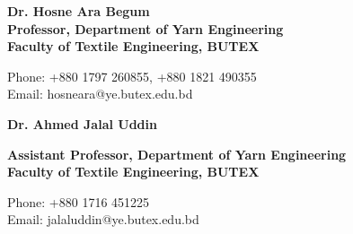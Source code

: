 \noindent
\begin{minipage}[t]{0.50\textwidth}
    \raggedright
    {\noindent\fontsize{12pt}{15pt}\bfseries Dr. Hosne Ara Begum } \\
    {\fontsize{10pt}{12pt}\bfseries Professor, Department of Yarn Engineering} \\
    {\fontsize{10pt}{12pt}\bfseries Faculty of Textile Engineering, BUTEX}\par
    \vspace{0.7em}
    {Phone: +880 1797 260855, +880 1821 490355}\\
    {Email: hosneara@ye.butex.edu.bd}
\end{minipage}%
\hfill
\begin{minipage}[t]{0.50\textwidth}
    \raggedright
    {\noindent\fontsize{12pt}{15pt}\bfseries Dr. Ahmed Jalal Uddin } \par
    {\fontsize{10pt}{12pt}\bfseries Assistant Professor, Department of Yarn Engineering} \\
    {\fontsize{10pt}{12pt}\bfseries Faculty of Textile Engineering, BUTEX}\par
    \vspace{0.7em}
    {Phone: +880 1716 451225}\\
    {Email: jalaluddin@ye.butex.edu.bd}
\end{minipage}